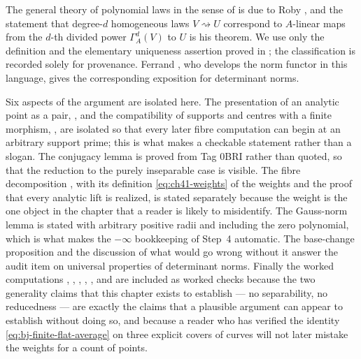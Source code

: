 The general theory of polynomial laws in the sense of
 is due to Roby \cite{Roby1963}, and the
statement that degree-$d$ homogeneous laws $V\rightsquigarrow U$ correspond to
$A$-linear maps from the $d$-th divided power $\Gamma^d_A(V)$ to
$U$ is his theorem.  We use only the definition and the elementary
uniqueness assertion proved in ; the classification
is recorded solely for provenance.  Ferrand \cite{FerrandNorm}, who develops
the norm functor in this language, gives the corresponding exposition for
determinant norms.

Six aspects of the argument are isolated here.  The presentation of an analytic point as a pair,
, and the compatibility of supports and centres
with a finite morphism, , are isolated
so that every later fibre computation can begin at an arbitrary support
prime; this is what makes  a checkable
statement rather than a slogan.  The conjugacy lemma
 is proved from Tag 0BRI rather than
quoted, so that the reduction to the purely inseparable case is visible.
The fibre decomposition , with its
definition \eqref{eq:ch41-weights} of the weights and the proof that every
analytic lift is realized, is stated separately because the weight is the
one object in the chapter that a reader is likely to misidentify.  The
Gauss-norm lemma  is stated with
arbitrary positive radii and including the zero polynomial, which is what
makes the $-\infty$ bookkeeping of Step~4 automatic.  The base-change
proposition  and the discussion
 of what would go wrong without it answer the audit
item on universal properties of determinant norms.  Finally the worked
computations , ,
, ,
,  and
 are included as worked checks because the two
generality claims that this chapter exists to establish --- no separability,
no reducedness --- are exactly the claims that a plausible argument can
appear to establish without doing so, and because a reader who has verified
the identity \eqref{eq:bj-finite-flat-average} on three explicit covers of
curves will not later mistake the weights for a count of points.

